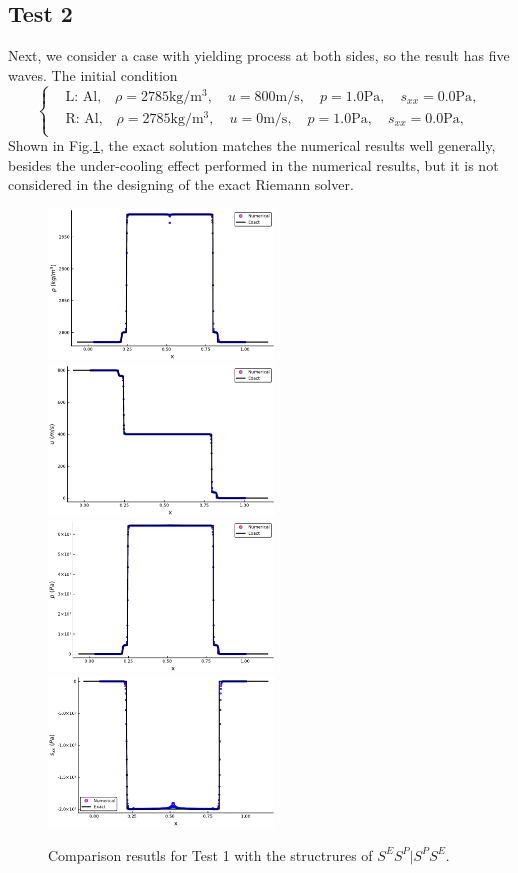 \documentclass[review]{elsarticle}
\begin{document}
\subsection{Test 2}
Next, we consider a case with yielding process at both sides, so the result has five waves. The initial condition 
\begin{equation}
 \left\{ \begin{aligned}
	 &	 \text{L: Al,}\quad  \rho = 2785 \text{kg}/\text{m}^3, \quad  u = 800\text{m}/\text{s}, \quad  p = 1.0\text{Pa}, \quad  s_{xx}=0.0 \text{Pa},\\
&	 \text{R: Al,}\quad  \rho = 2785 \text{kg}/\text{m}^3, \quad  u = 0\text{m}/\text{s}, \quad  p = 1.0\text{Pa}, \quad  s_{xx}=0.0 \text{Pa},\\
   \end{aligned}
 \right.
\end{equation}
Shown in Fig.\ref{fig:case2}, the exact solution matches the numerical results well generally, besides the under-cooling effect performed in the numerical results, but it is not considered in the designing of the exact Riemann solver. 
\begin{figure}
  \centering
\includegraphics[width= 6cm] {case2rho.pdf}
  \includegraphics[width= 6cm] {case2u.pdf}
  \includegraphics[width= 6cm] {case2p.pdf}
  \includegraphics[width= 6cm] {case2sxx.pdf}
  \caption{Comparison resutls for Test 1 with the structrures of $S^ES^P|S^PS^E$.  }
  \label{fig:case2}
\end{figure}
\end{document}
